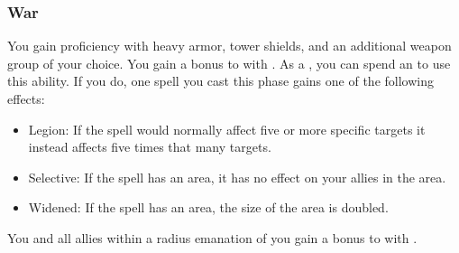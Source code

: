         \subsubsection{War}
             You gain proficiency with heavy armor, tower shields, and an additional weapon group of your choice.
             You gain a  bonus to  with .
             As a , you can spend an  to use this ability.
            If you do, one spell you cast this phase gains one of the following effects:
            \begin{itemize}
                \item Legion: If the spell would normally affect five or more specific targets it instead affects five times that many targets.
                \item Selective: If the spell has an area, it has no effect on your allies in the area.
                \item Widened: If the spell has an area, the size of the area is doubled.
            \end{itemize}
             You and all allies within a \arealarge radius emanation of you gain a  bonus to  with .

